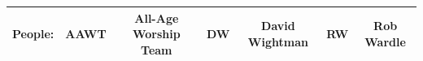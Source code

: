 \documentclass[10pt]{article}
\begin{document}
\begin{center}
{\begin{tabular}
\end{tabular}
}

\vspace{1em}
\begin{tabular}{|c|c|c|c|c|c|c|}\hline
{\bf People: } &
AAWT & All-Age Worship Team & DW & David Wightman &
RW & Rob Wardle\\%
     \hline
  \end{tabular}
\end{center}
\end{document}
